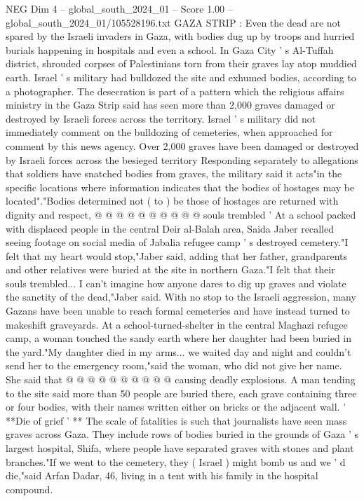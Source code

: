 \begin{textsample}{NEG Dim 4 – global\_south\_2024\_01 – Score 1.00 – global\_south\_2024\_01/105528196.txt}  \label{ex:f4_neg_082}
GAZA STRIP : Even the dead are not spared by the Israeli invaders in Gaza, with bodies dug up by troops and hurried burials happening in hospitals and even a school.
In Gaza City ' s Al-Tuffah district, shrouded corpses of Palestinians torn from their graves lay atop muddied earth.
Israel ' s military had bulldozed the site and exhumed bodies, according to a photographer.
The desecration is part of a pattern which the religious affairs ministry in the Gaza Strip said has seen more than 2,000 graves damaged or destroyed by Israeli forces across the territory.
Israel ' s military did not immediately comment on the bulldozing of cemeteries, when approached for comment by this news agency.
Over 2,000 graves have been damaged or destroyed by Israeli forces across the besieged territory Responding separately to allegations that soldiers have snatched bodies from graves, the military said it acts"in the specific locations where information indicates that the bodies of hostages may be located"."Bodies determined not ( to ) be those of hostages are returned with dignity and respect, @ @ @ @ @ @ @ @ @ @ souls trembled ' At a school packed with displaced people in the central Deir al-Balah area, Saida Jaber recalled seeing footage on social media of Jabalia refugee camp ' s destroyed cemetery."I felt that my heart would stop,"Jaber said, adding that her father, grandparents and other relatives were buried at the site in northern Gaza."I felt that their souls trembled...
I can't imagine how anyone dares to dig up graves and violate the sanctity of the dead,"Jaber said.
With no stop to the Israeli aggression, many Gazans have been unable to reach formal cemeteries and have instead turned to makeshift graveyards.
At a school-turned-shelter in the central Maghazi refugee camp, a woman touched the sandy earth where her daughter had been buried in the yard."My daughter died in my arms... we waited day and night and couldn't send her to the emergency room,"said the woman, who did not give her name.
She said that @ @ @ @ @ @ @ @ @ @ causing deadly explosions.
A man tending to the site said more than 50 people are buried there, each grave containing three or four bodies, with their names written either on bricks or the adjacent wall. ' **Die of grief ' ** The scale of fatalities is such that journalists have seen mass graves across Gaza.
They include rows of bodies buried in the grounds of Gaza ' s largest hospital, Shifa, where people have separated graves with stones and plant branches."If we went to the cemetery, they ( Israel ) might bomb us and we ' d die,"said Arfan Dadar, 46, living in a tent with his family in the hospital compound.

\end{textsample}
